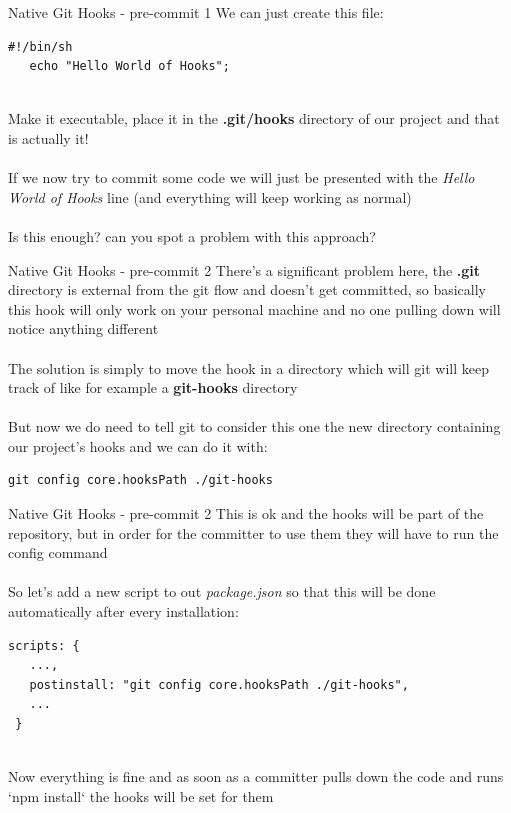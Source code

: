 \documentclass[11pt]{beamer}
\begin{document}
\begin{frame}[fragile]{Native Git Hooks - pre-commit 1}
  We can just create this file:
    \begin{lstlisting}[frame=single,columns=fullflexible]
   #!/bin/sh
   echo "Hello World of Hooks";
   \end{lstlisting}
  ~\\
  Make it executable, place it in the \textbf{.git/hooks} directory of our project and that is actually it!
  \\~\\
  If we now try to commit some code we will just be presented with the \textit{Hello World of Hooks} line (and everything will keep working as normal)
  \\~\\
  Is this enough? can you spot a problem with this approach?
\end{frame}


\begin{frame}[fragile]{Native Git Hooks - pre-commit 2}
 There's a significant problem here, the \textbf{.git} directory is external from the git flow and doesn't get committed, so basically this hook will only work on your  personal machine and no one pulling down will notice anything different
 \\~\\
 The solution is simply to move the hook in a directory which will git will keep track of like for example a \textbf{git-hooks} directory
 \\~\\
 But now we do need to tell git to consider this one the new directory containing our project's hooks and we can do it with:
 \begin{lstlisting}[columns=fullflexible]
   git config core.hooksPath ./git-hooks
 \end{lstlisting}
\end{frame}



\begin{frame}[fragile]{Native Git Hooks - pre-commit 2}
  This is ok and the hooks will be part of the repository, but in order for the committer to use them they will have to run the config command
  \\~\\
  So let's add a new script to out \textit{package.json} so that this will be done automatically after every installation:
  \begin{footnotesize}
    \begin{lstlisting}[frame=single,columns=fullflexible]
 scripts: {
   ...,
   postinstall: "git config core.hooksPath ./git-hooks",
   ...
 }
   \end{lstlisting}
  \end{footnotesize}
  ~\\
  Now everything is fine and as soon as a committer pulls down the code and runs `npm install` the hooks will be set for them 
\end{frame}
\end{document}

